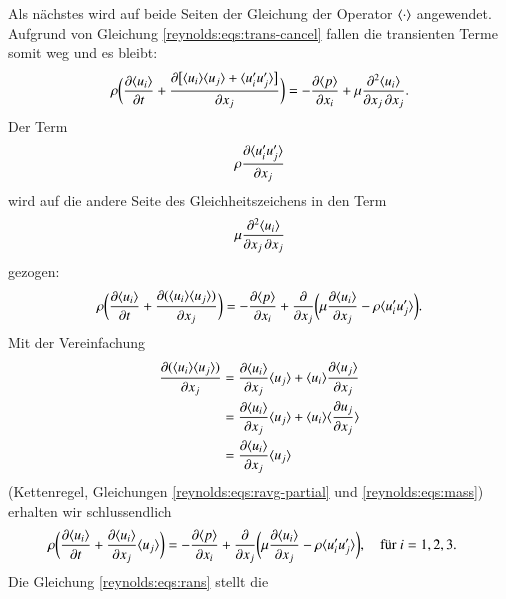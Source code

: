 %
Als nächstes wird auf beide Seiten der Gleichung der Operator $\ravg{\cdot}$ angewendet.
Aufgrund von Gleichung \eqref{reynolds:eqs:trans-cancel} fallen die transienten Terme somit
weg und es bleibt:
%
\begin{equation*}
    \rho \biggl(
            \frac{\partial \ravg{u_i}}{\partial t} +
            \frac{\partial \bigl[ \ravg{u_i} \ravg{u_j} + \ravg{u_i' u_j'} \bigr]}{\partial x_j}
        \biggr) =
        - \frac{\partial \ravg{p}}{\partial x_i} + 
        \mu \frac{\partial^2 \ravg{u_i}}{\partial x_j\, \partial x_j}.
\end{equation*}
%
Der Term 
%
$$\rho \frac{\partial \ravg{u_i' u_j'}}{\partial x_j}$$
%
wird auf die andere Seite des Gleichheitszeichens in den Term 
%
$$\mu \frac{\partial^2 \ravg{u_i}}{\partial x_j\, \partial x_j}$$
%
gezogen:
%
\begin{equation*}
    \rho \biggl(
            \frac{\partial \ravg{u_i}}{\partial t} +
            \frac{\partial ( \ravg{u_i} \ravg{u_j})}{\partial x_j}
        \biggr) =
        - \frac{\partial \ravg{p}}{\partial x_i} + 
            \frac{\partial}{\partial x_j} 
                \biggl(
                    \mu \frac{\partial \ravg{u_i}}{\partial x_j} - \rho \ravg{u_i' u_j'}
                \biggr).
\end{equation*}
%
Mit der Vereinfachung
%
\begin{align*}
    \frac{\partial ( \ravg{u_i} \ravg{u_j})}{\partial x_j} &=
    \frac{\partial \ravg{u_i}}{\partial x_j} \ravg{u_j} +
    \ravg{u_i} \frac{\partial \ravg{u_j}}{\partial x_j} \\
    &= \frac{\partial \ravg{u_i}}{\partial x_j} \ravg{u_j} +
    \ravg{u_i} \ravg{\frac{\partial u_j}{\partial x_j}} \\
    &= \frac{\partial \ravg{u_i}}{\partial x_j} \ravg{u_j}
\end{align*}
%
(Kettenregel, Gleichungen \eqref{reynolds:eqs:ravg-partial} und \eqref{reynolds:eqs:mass}) erhalten wir schlussendlich
%
\begin{align}
    \label{reynolds:eqs:rans}
    \rho \biggl(
            \frac{\partial \ravg{u_i}}{\partial t} +
            \frac{\partial \ravg{u_i}}{\partial x_j} \ravg{u_j}
        \biggr) &=
        - \frac{\partial \ravg{p}}{\partial x_i} + 
            \frac{\partial}{\partial x_j}
            \biggl(
                \mu \frac{\partial \ravg{u_i}}{\partial x_j} - \rho \ravg{u_i' u_j'}
            \biggr),\quad\text{für $i=1,2,3$}.
\end{align}
%
Die Gleichung \eqref{reynolds:eqs:rans} stellt die

